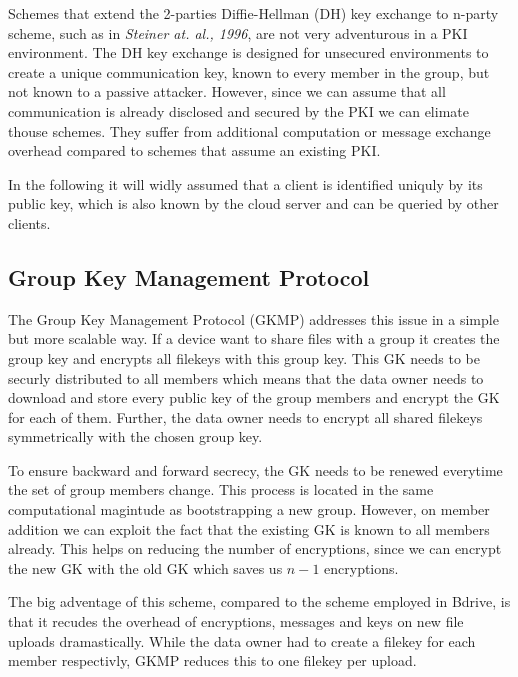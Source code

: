 Schemes that extend the 2-parties Diffie-Hellman (DH) key exchange to n-party scheme, such as in \textit{Steiner at. al., 1996}\cite{steiner1996diffie}, are not very adventurous in a PKI environment. The DH key exchange is designed for unsecured environments to create a unique communication key, known to every member in the group, but not known to a passive attacker. However, since we can assume that all communication is already disclosed and secured by the PKI we can elimate thouse schemes. They suffer from additional computation or message exchange overhead compared to schemes that assume an existing PKI.   

In the following it will widly assumed that a client is identified uniquly by its public key, which is also known by the cloud server and can be queried by other clients. 

\subsection{Group Key Management Protocol}
The Group Key Management Protocol (GKMP)\cite{harney1997group} addresses this issue in a simple but more scalable way. If a device want to share files with a group it creates the group key and encrypts all filekeys with this group key. This GK needs to be securly distributed to all members which means that the data owner needs to download and store every public key of the group members and encrypt the GK for each of them. Further, the data owner needs to encrypt all shared filekeys symmetrically with the chosen group key. 

To ensure backward and forward secrecy, the GK needs to be renewed everytime the set of group members change. This process is located in the same computational magintude as bootstrapping a new group. However, on member addition we can exploit the fact that the existing GK is known to all members already. This helps on reducing the number of encryptions, since we can encrypt the new GK with the old GK which saves us $n-1$ encryptions.  

The big adventage of this scheme, compared to the scheme employed in Bdrive, is that it recudes the overhead of encryptions, messages and keys on new file uploads dramastically. While the data owner had to create a filekey for each member respectivly, GKMP reduces this to one filekey per upload.  

